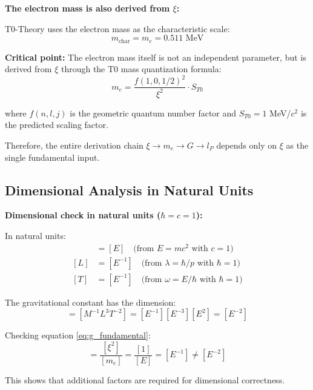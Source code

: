 \documentclass[12pt,a4paper]{article}
\begin{document}
	\begin{insight}
		\textbf{The electron mass is also derived from $\xi$:}
		
		T0-Theory uses the electron mass as the characteristic scale:
		\begin{equation}
			m_{\text{char}} = m_e = 0.511 \text{ MeV}
			\label{eq:characteristic_mass}
		\end{equation}
		
		\textbf{Critical point:} The electron mass itself is not an independent parameter, but is derived from $\xi$ through the T0 mass quantization formula:
		\begin{equation}
			m_e = \frac{f(1,0,1/2)^2}{\xi^2} \cdot S_{T0}
		\end{equation}
		
		where $f(n,l,j)$ is the geometric quantum number factor and $S_{T0} = 1$ MeV/$c^2$ is the predicted scaling factor.
		
		Therefore, the entire derivation chain $\xi \to m_e \to G \to l_P$ depends only on $\xi$ as the single fundamental input.
	\end{insight}
	
	\subsection{Dimensional Analysis in Natural Units}
	
	\begin{derivation}
		\textbf{Dimensional check in natural units ($\hbar = c = 1$):}
		
		In natural units:
		\begin{align}
			[M] &= [E] \quad \text{(from } E = mc^2 \text{ with } c = 1\text{)} \\
			[L] &= [E^{-1}] \quad \text{(from } \lambda = \hbar/p \text{ with } \hbar = 1\text{)} \\
			[T] &= [E^{-1}] \quad \text{(from } \omega = E/\hbar \text{ with } \hbar = 1\text{)}
		\end{align}
		
		The gravitational constant has the dimension:
		\begin{equation}
			[G] = [M^{-1}L^3T^{-2}] = [E^{-1}][E^{-3}][E^2] = [E^{-2}]
		\end{equation}
		
		Checking equation \eqref{eq:g_fundamental}:
		\begin{equation}
			[G] = \frac{[\xi^2]}{[m_e]} = \frac{[1]}{[E]} = [E^{-1}] \neq [E^{-2}]
		\end{equation}
		
		This shows that additional factors are required for dimensional correctness.
	\end{derivation}
	
\end{document}
